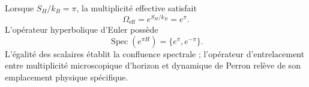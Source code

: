 Lorsque \(S_H/k_B=\pi\), la multiplicité effective satisfait
\begin{equation}
 \Omega_{\mathrm{eff}}=e^{S_H/k_B}=e^\pi.
 \label{eq:l9s102:omega-e-pi}
\end{equation}
L'opérateur hyperbolique d'Euler possède
\begin{equation}
 \operatorname{Spec}(e^{\pi H})=\{e^\pi,e^{-\pi}\}.
 \label{eq:l9s102:e-pi-spectrum}
\end{equation}
L'égalité des scalaires établit la confluence spectrale ;
l'opérateur d'entrelacement entre multiplicité microscopique d'horizon et dynamique de
Perron relève de son emplacement physique spécifique.
